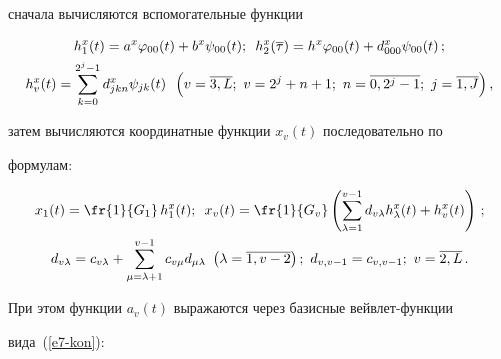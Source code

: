 сначала вычисляются вспомогательные функции 


  \begin{gather*}






  h_1^x(t)=a^x\varphi_{00}(t)+b^x\psi_{00}(t);\enskip h_2^x(\overline{\tau}) =h^x 


\varphi_{00}(t)+d^x_{000}\psi_{00}(t)\,;\\


  h_v^x(t)=\displaystyle\sum\limits_{k=0}^{2^j-1} d^x_{jkn} \psi_{jk}(t)\enskip 


   \left(  v=\overline{3,L};\ v=2^j+n+1;\ n=\overline{0, 2^j-1};\ j=\overline{1,J}\right),








  \end{gather*}


затем вычисляются координатные функции $x_v(t)$ последовательно по 


формулам:


\begin{gather*}






x_1(t)=\fr{1}{G_1} \,h_1^x(t);\enskip x_v(t)=\fr{1}{G_v}\left( 


\sum\limits_{\lambda=1}^{v-1} d_{v\lambda} 


h_\lambda^x(t)+h_v^x(t)\right)\,;\\


d_{v\lambda} =c_{v\lambda} +\sum\limits_{\mu=\lambda+1}^{v-1} c_{v\mu} 


d_{\mu\lambda}\ \left( \lambda=\overline{1,v-2}\right);\ d_{v,v-1} =c_{v,v-1};\ 


v=\overline{2,L}\,.








\end{gather*}


При этом функции $a_v(t)$ выражаются через базисные вейв\-лет-функ\-ции 


вида~(\ref{e7-kon}):



